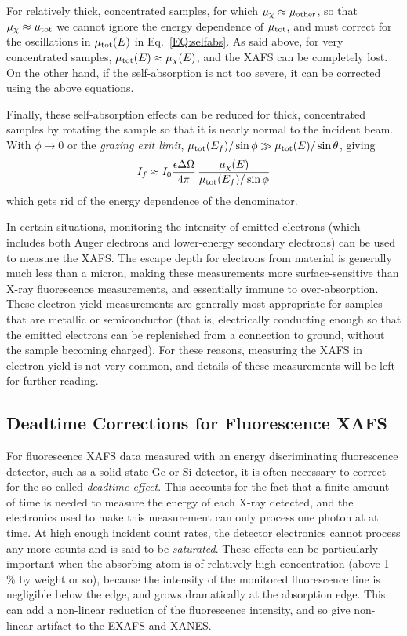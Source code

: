 For relatively thick, concentrated samples, for which $\mu_\chi \approx
\mu_{\rm other}$, so that $ \mu_\chi \approx \mu_{\rm tot} $ we cannot ignore
the energy dependence of $\mu_{\rm tot}$, and must correct for the
oscillations in $\mu_{\rm tot}(E)$ in Eq.~\ref{EQ:selfabs}. As said above,
for very concentrated samples, $ \mu_{\rm tot}(E) \approx \mu_{\chi}(E)$,
and the XAFS can be completely lost.  On the other hand, if the
self-absorption is not too severe, it can be corrected using the above
equations\cite{BoothBridges2005,Pfalzer1999}.

Finally, these self-absorption effects can be reduced for thick,
concentrated samples by rotating the sample so that it is nearly normal to
the incident beam.  With $\phi \rightarrow 0$ or the {\emph{grazing exit
    limit}}, $\mu_{\rm tot}(E_f)/\sin\phi \gg \mu_{\rm tot}(E)/\sin\theta$,
giving
\begin{equation}
  I_f \approx I_0 {\frac{\epsilon\Delta\Omega}{4\pi}} \,
  {\frac{\mu_{\chi}(E)}{\mu_{\rm tot}(E_f)/\sin\phi}}
\end{equation}
\noindent
which gets rid of the energy dependence of the denominator.


In certain situations, monitoring the intensity of emitted electrons (which
includes both Auger electrons and lower-energy secondary electrons) can be
used to measure the XAFS. The escape depth for electrons from material is
generally much less than a micron, making these measurements more
surface-sensitive than X-ray fluorescence measurements, and essentially
immune to over-absorption.  These electron yield measurements are generally
most appropriate for samples that are metallic or semiconductor (that is,
electrically conducting enough so that the emitted electrons can be
replenished from a connection to ground, without the sample becoming
charged).  For these reasons, measuring the XAFS in electron yield is not
very common, and details of these measurements will be left for further
reading.


\subsection{Deadtime Corrections for Fluorescence XAFS }

For fluorescence XAFS data measured with an energy discriminating
fluorescence detector, such as a solid-state Ge or Si detector, it is often
necessary to correct for the so-called {\emph{deadtime effect}}.  This
accounts for the fact that a finite amount of time is needed to measure the
energy of each X-ray detected, and the electronics used to make this
measurement can only process one photon at at time.  At high enough
incident count rates, the detector electronics cannot process any more
counts and is said to be {\emph{saturated}}.  These effects can be
particularly important when the absorbing atom is of relatively high
concentration (above 1 \% by weight or so), because the intensity of the
monitored fluorescence line is negligible below the edge, and grows
dramatically at the absorption edge.  This can add a non-linear reduction
of the fluorescence intensity, and so give non-linear artifact to the EXAFS
and XANES.

